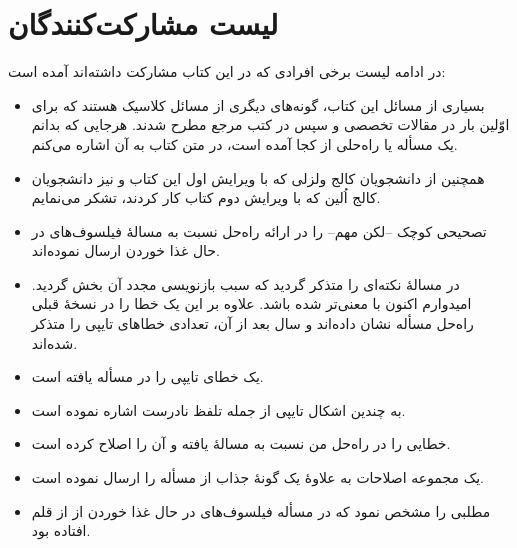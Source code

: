 \documentclass{book}
\begin{document}
\section*{لیست مشارکت‌کنندگان}

در ادامه لیست برخی افرادی که در این کتاب مشارکت داشته‌اند آمده است:

\begin{itemize}

\item    
    بسیاری از مسائل این کتاب، گونه‌های دیگری از مسائل کلاسیک هستند که برای اوّلین بار در مقالات تخصصی و سپس در کتب مرجع مطرح شدند. 
    هرجایی که بدانم یک مسأله یا راه‌حلی از کجا آمده است، در متن کتاب به آن اشاره می‌کنم.  

\item 
    همچنین از دانشجویان کالج ولزلی که با ویرایش اول این کتاب و نیز دانشجویان کالج اُلین
    که با ویرایش دوم کتاب  کار کردند، تشکر می‌نمایم. 

\item 
    تصحیحی کوچک --لکن مهم-- را در ارائه راه‌حل  نسبت به مسالهٔ فیلسوف‌های در حال غذا خوردن ارسال نموده‌اند.

\item {}
    در مسالهٔ  نکته‌ای را متذکر گردید که سبب بازنویسی مجدد آن بخش گردید. 
    امیدوارم اکنون با معنی‌تر شده باشد. 
    علاوه بر این  یک خطا را در نسخهٔ قبلی راه‌حل مسأله  نشان داده‌اند و سال بعد از آن، 
    تعدادی خطاهای تایپی را متذکر شده‌اند. 
    
\item {}
    یک خطای تایپی را در مسأله  یافته است. 

\item {}
    به چندین اشکال تایپی از جمله تلفظ نادرست  اشاره نموده است.

\item {}
    خطایی را در راه‌حل من نسبت به مسالهٔ  یافته و آن را اصلاح کرده است. 


\item {}
    یک مجموعه اصلاحات به علاوهٔ یک گونهٔ جذاب از مسأله  را ارسال نموده است. 
    
    

\item {} 
    مطلبی را مشخص نمود که در مسأله فیلسوف‌های در حال غذا خوردن از از قلم افتاده بود. 
    


\end{itemize}
\end{document}
